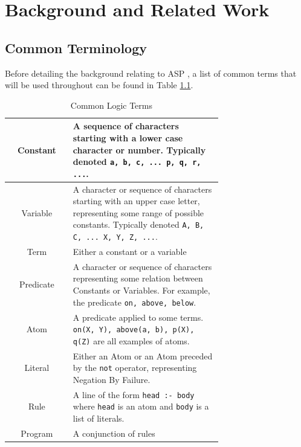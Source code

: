\chapter{Background and Related Work}

\section{Common Terminology}
Before detailing the background relating to ASP \cite{Lifschitz1999}, a list of common terms that will be used throughout can be found in Table \ref{table:4}.

\begin{table}[p!]
\centering
\makeatletter
\@fpsep\textheight
\makeatother
\begin{tabular}{| c | m{0.7\linewidth} |}
\hline
Constant & 
\mbox{}\newline
A sequence of characters starting with a lower case character or number. Typically denoted \lstinline!a, b, c, ... p, q, r, ...!. \newline
\\
\hline
Variable & 
\mbox{}\newline
A character or sequence of characters starting with an upper case letter, representing some range of possible constants. Typically denoted \lstinline!A, B, C, ... X, Y, Z, ...!.\newline
\\
\hline
Term &
\mbox{}\newline
Either a constant or a variable \newline
\\
\hline
Predicate &
\mbox{}\newline
A character or sequence of characters representing some relation between Constants or Variables. For example, the predicate \lstinline!on, above, below!. \newline
 \\
\hline
Atom &
\mbox{}\newline
A predicate applied to some terms. \lstinline!on(X, Y), above(a, b), p(X), q(Z)! are all examples of atoms.\newline
 \\
\hline
Literal & 
\mbox{}\newline
Either an Atom or an Atom preceded by the \lstinline!not! operator, representing Negation By Failure. \newline
\\
\hline
Rule & 
\mbox{}\newline
A line of the form \lstinline!head :- body! where \lstinline!head! is an atom and \lstinline!body! is a list of literals.
\newline
 \\
\hline
Program &
\mbox{}\newline
A conjunction of rules \newline
\\
\hline
\end{tabular}
\caption{Common Logic Terms \cite{Muggleton1991}}
\label{table:4}
\clearpage
\end{table}

